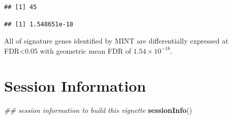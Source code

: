 \documentclass[]{book}
\newenvironment{Shaded}{\begin{snugshade}}{\end{snugshade}}
\newcommand{\CommentTok}[1]{\textcolor[rgb]{0.56,0.35,0.01}{\textit{#1}}}
\newcommand{\KeywordTok}[1]{\textcolor[rgb]{0.13,0.29,0.53}{\textbf{#1}}}
\newcommand{\NormalTok}[1]{#1}
\newcommand{\OperatorTok}[1]{\textcolor[rgb]{0.81,0.36,0.00}{\textbf{#1}}}
\theoremstyle{definition}
\theoremstyle{definition}
\theoremstyle{definition}
\theoremstyle{remark}
\begin{document}
\begin{verbatim}
## [1] 45
\end{verbatim}

\begin{Shaded}
\end{Shaded}

\begin{verbatim}
## [1] 1.548651e-18
\end{verbatim}

All of signature genes identified by MINT are differentially expressed
at FDR\textless{}0.05 with geometric mean FDR of \(1.54\times10^{-18}\).

\hypertarget{session-information-1}{%
\section{Session Information}\label{session-information-1}}

\begin{Shaded}
\begin{Highlighting}[]
\CommentTok{## session information to build this vignette}
\KeywordTok{sessionInfo}\NormalTok{()}
\end{Highlighting}
\end{Shaded}
\end{document}
